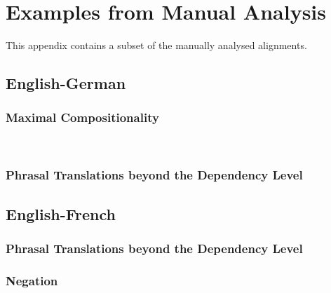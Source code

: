 \documentclass[]{report}
\begin{document}
\appendix
\chapter{Examples from Manual Analysis}

This appendix contains a subset of the manually analysed alignments.

\section{English-German}

\subsection{Maximal Compositionality}
\label{subsec:de_noncomp}

\\




\subsection{Phrasal Translations beyond the Dependency Level}
\label{subsec:de_phrasal}



\section{English-French}

\subsection{Phrasal Translations beyond the Dependency Level}
\label{subsec:fr_phrasal}



\subsection{Negation}
\label{subsec:negation}


\end{document}
